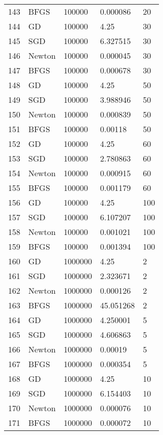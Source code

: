 \begin{tabular}{lllll}
143 &    BFGS &   100000 &   0.000086 &     20 \\
144 &      GD &   100000 &       4.25 &     30 \\
145 &     SGD &   100000 &   6.327515 &     30 \\
146 &  Newton &   100000 &   0.000045 &     30 \\
147 &    BFGS &   100000 &   0.000678 &     30 \\
148 &      GD &   100000 &       4.25 &     50 \\
149 &     SGD &   100000 &   3.988946 &     50 \\
150 &  Newton &   100000 &   0.000839 &     50 \\
151 &    BFGS &   100000 &    0.00118 &     50 \\
152 &      GD &   100000 &       4.25 &     60 \\
153 &     SGD &   100000 &   2.780863 &     60 \\
154 &  Newton &   100000 &   0.000915 &     60 \\
155 &    BFGS &   100000 &   0.001179 &     60 \\
156 &      GD &   100000 &       4.25 &    100 \\
157 &     SGD &   100000 &   6.107207 &    100 \\
158 &  Newton &   100000 &   0.001021 &    100 \\
159 &    BFGS &   100000 &   0.001394 &    100 \\
160 &      GD &  1000000 &       4.25 &      2 \\
161 &     SGD &  1000000 &   2.323671 &      2 \\
162 &  Newton &  1000000 &   0.000126 &      2 \\
163 &    BFGS &  1000000 &  45.051268 &      2 \\
164 &      GD &  1000000 &   4.250001 &      5 \\
165 &     SGD &  1000000 &   4.606863 &      5 \\
166 &  Newton &  1000000 &    0.00019 &      5 \\
167 &    BFGS &  1000000 &   0.000354 &      5 \\
168 &      GD &  1000000 &       4.25 &     10 \\
169 &     SGD &  1000000 &   6.154403 &     10 \\
170 &  Newton &  1000000 &   0.000076 &     10 \\
171 &    BFGS &  1000000 &   0.000072 &     10 \\

\end{tabular}
